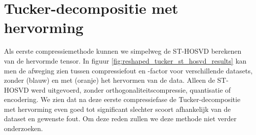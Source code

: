 \section{Tucker-decompositie met hervorming}

Als eerste compressiemethode kunnen we simpelweg de ST-HOSVD berekenen van de hervormde tensor. In figuur \ref{fig:reshaped_tucker_st_hosvd_results} kan men de afweging zien tussen compressiefout en -factor voor verschillende datasets, zonder (blauw) en met (oranje) het hervormen van de data. Alleen de ST-HOSVD werd uitgevoerd, zonder orthogonaliteitscompressie, quantisatie of encodering. We zien dat na deze eerste compressiefase de Tucker-decompositie met hervorming even goed tot significant slechter scoort afhankelijk van de dataset en gewenste fout. Om deze reden zullen we deze methode niet verder onderzoeken.

